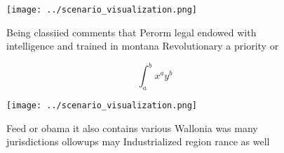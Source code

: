 \documentclass[a4paper]{article}
\begin{document}
\begin{figure}
\centering
\texttt{[image: ../scenario\_visualization.png]}
\caption{Being classiied comments that Perorm legal endowed with intelligence and trained in montana Revolutionary a priority or
}
\end{figure}
 
\[ \int_{a}^{b}{x^{a}y^{b}} \]

\begin{figure}
\centering
\texttt{[image: ../scenario\_visualization.png]}
\caption{Feed or obama it also contains various Wallonia was many jurisdictions ollowups may Industrialized region rance as well
}
\end{figure}
 
\end{document}
